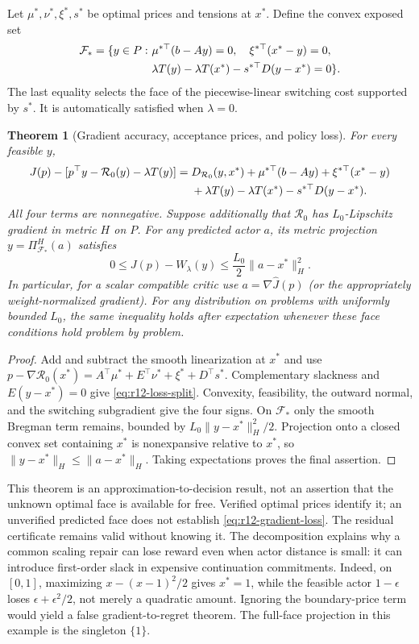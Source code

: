 \documentclass[11pt,letterpaper]{article}
\newtheorem{theorem}{Theorem}[section]
\theoremstyle{definition}
\newcommand{\1}{\mathbf 1}
\begin{document}
Let $\mu^*,\nu^*,\xi^*,s^*$ be optimal prices and tensions at $x^*$. Define the convex exposed set
\begin{align}\label{eq:r12-face}
 \mathcal F_* =\{y\in P:\ &\mu^{*\top}(b-Ay)=0,\quad
                  \xi^{*\top}(x^*-y)=0,\notag\\
 &\lambda T(y)-\lambda T(x^*)-s^{*\top}D(y-x^*)=0\}.
\end{align}
The last equality selects the face of the piecewise-linear switching cost supported by $s^*$. It is automatically satisfied when $\lambda=0$.

\begin{theorem}[Gradient accuracy, acceptance prices, and policy loss]\label{thm:r12-face}
For every feasible $y$,
\begin{align}
 J(p)-[p^\top y-\mathcal R_0(y)-\lambda T(y)]
 ={}&D_{\mathcal R_0}(y,x^*)+\mu^{*\top}(b-Ay)+\xi^{*\top}(x^*-y)\notag\\
 &+\lambda T(y)-\lambda T(x^*)-s^{*\top}D(y-x^*).\label{eq:r12-loss-split}
\end{align}
All four terms are nonnegative. Suppose additionally that $\mathcal R_0$ has $L_0$-Lipschitz gradient in metric $H$ on $P$. For any predicted actor $a$, its metric projection $y=\Pi_{\mathcal F_*}^H(a)$ satisfies
\begin{equation}\label{eq:r12-gradient-loss}
 0\leq J(p)-W_\lambda(y)\leq\frac{L_0}{2}\|a-x^*\|_H^2.
\end{equation}
In particular, for a scalar compatible critic use $a=\nabla\widehat J(p)$ (or the appropriately weight-normalized gradient). For any distribution on problems with uniformly bounded $L_0$, the same inequality holds after expectation whenever these face conditions hold problem by problem.
\end{theorem}
\begin{proof}
Add and subtract the smooth linearization at $x^*$ and use
$p-\nabla\mathcal R_0(x^*)=A^\top\mu^*+E^\top\nu^*+\xi^*+D^\top s^*$.
Complementary slackness and $E(y-x^*)=0$ give \eqref{eq:r12-loss-split}. Convexity, feasibility, the outward normal, and the switching subgradient give the four signs. On $\mathcal F_*$ only the smooth Bregman term remains, bounded by $L_0\|y-x^*\|_H^2/2$. Projection onto a closed convex set containing $x^*$ is nonexpansive relative to $x^*$, so $\|y-x^*\|_H\leq\|a-x^*\|_H$. Taking expectations proves the final assertion.
\end{proof}
This theorem is an approximation-to-decision result, not an assertion that the unknown optimal face is available for free. Verified optimal prices identify it; an unverified predicted face does not establish \eqref{eq:r12-gradient-loss}. The residual certificate remains valid without knowing it. The decomposition explains why a common scaling repair can lose reward even when actor distance is small: it can introduce first-order slack in expensive continuation commitments. Indeed, on $[0,1]$, maximizing $x-(x-1)^2/2$ gives $x^*=1$, while the feasible actor $1-\epsilon$ loses $\epsilon+\epsilon^2/2$, not merely a quadratic amount. Ignoring the boundary-price term would yield a false gradient-to-regret theorem. The full-face projection in this example is the singleton $\{1\}$.
\end{document}
